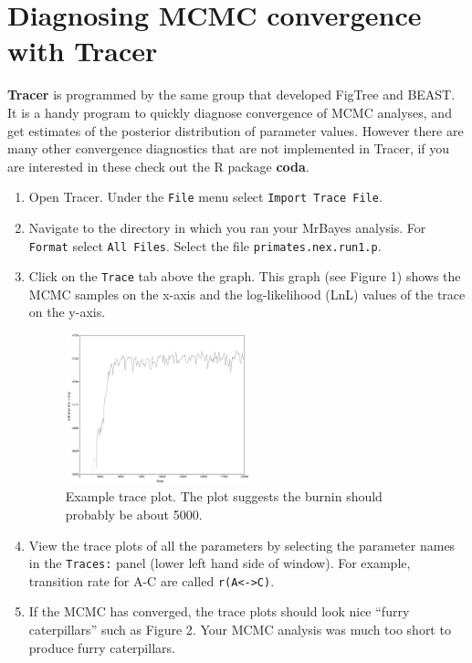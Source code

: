 \documentclass[11pt]{article}
\begin{document}
\section{Diagnosing MCMC convergence with Tracer}

\textbf{Tracer} is programmed by the same group that developed FigTree and BEAST.
It is a handy program to quickly diagnose convergence of MCMC analyses,
and get estimates of the posterior distribution of parameter values.
However there are many other convergence diagnostics that are not implemented in Tracer, 
if you are interested in these check out the R package \textbf{coda}.

\begin{enumerate}

\item Open Tracer. Under the \texttt{File} menu select \texttt{Import Trace File}.

\item Navigate to the directory in which you ran your MrBayes analysis.
For \texttt{Format} select \texttt{All Files}. 
Select the file \texttt{primates.nex.run1.p}.

\item Click on the \texttt{Trace} tab above the graph. This graph (see Figure 1)
shows the MCMC samples on the x-axis and the log-likelihood (LnL) values of the trace on the y-axis.

\begin{figure}
\centering
\includegraphics[width=0.5\textwidth]{trace.pdf}
\caption{Example trace plot. The plot suggests the burnin should probably be about 5000.}
\end{figure}

\item View the trace plots of all the parameters by selecting the parameter names in the
\texttt{Traces:} panel (lower left hand side of window). 
For example, transition rate for A-C are called \texttt{r(A<->C)}. 

\item If the MCMC has converged, the trace plots should look nice ``furry 
caterpillars'' such as Figure 2. 
Your MCMC analysis was much too short to produce furry caterpillars.


\end{enumerate}
\end{document}
